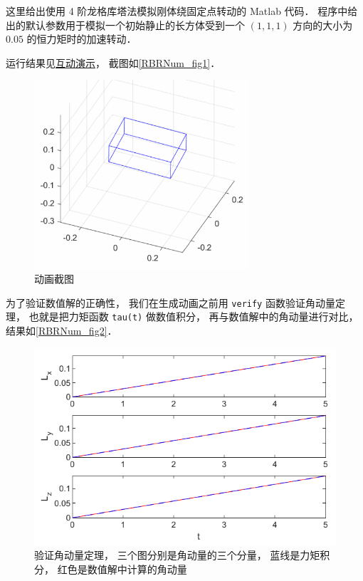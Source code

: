 

这里给出使用 4 阶龙格库塔法模拟刚体绕固定点转动的 Matlab 代码． 程序中给出的默认参数用于模拟一个初始静止的长方体受到一个 $(1,1,1)$ 方向的大小为 $0.05$ 的恒力矩时的加速转动．

运行结果见\href{http://wuli.wiki/apps/rigBdRot.html}{互动演示}， 截图如\autoref{RBRNum_fig1}．

\begin{figure}[ht]
\centering
\includegraphics[width=8cm]{./figures/RBRNum_1.png}
\caption{动画截图} \label{RBRNum_fig1}
\end{figure}

为了验证数值解的正确性， 我们在生成动画之前用 \verb|verify| 函数验证角动量定理， 也就是把力矩函数 \verb|tau(t)| 做数值积分， 再与数值解中的角动量进行对比， 结果如\autoref{RBRNum_fig2}．
\begin{figure}[ht]
\centering
\includegraphics[width=12cm]{./figures/RBRNum_1.pdf}
\caption{验证角动量定理， 三个图分别是角动量的三个分量， 蓝线是力矩积分， 红色是数值解中计算的角动量} \label{RBRNum_fig2}
\end{figure}

